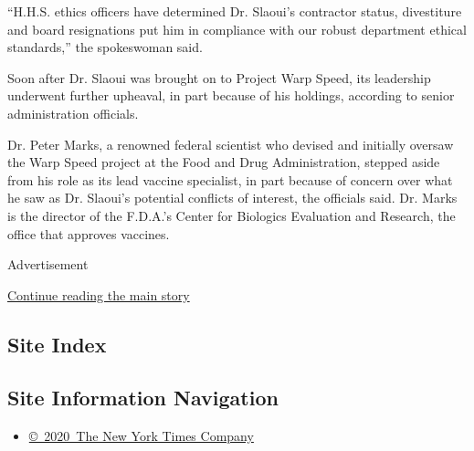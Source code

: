 ``H.H.S. ethics officers have determined Dr. Slaoui's contractor status,
divestiture and board resignations put him in compliance with our robust
department ethical standards,'' the spokeswoman said.

Soon after Dr. Slaoui was brought on to Project Warp Speed, its
leadership underwent further upheaval, in part because of his holdings,
according to senior administration officials.

Dr. Peter Marks, a renowned federal scientist who devised and initially
oversaw the Warp Speed project at the Food and Drug Administration,
stepped aside from his role as its lead vaccine specialist, in part
because of concern over what he saw as Dr. Slaoui's potential conflicts
of interest, the officials said. Dr. Marks is the director of the
F.D.A.'s Center for Biologics Evaluation and Research, the office that
approves vaccines.

Advertisement

\protect\hyperlink{after-bottom}{Continue reading the main story}

\hypertarget{site-index}{%
\subsection{Site Index}\label{site-index}}

\hypertarget{site-information-navigation}{%
\subsection{Site Information
Navigation}\label{site-information-navigation}}

\begin{itemize}
\tightlist
\item
  \href{https://help.nytimes.com/hc/en-us/articles/115014792127-Copyright-notice}{©~2020~The
  New York Times Company}
\end{itemize}


